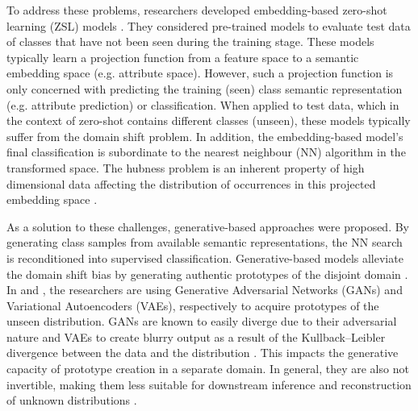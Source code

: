 \documentclass{article}
\begin{document}
To address these problems, researchers developed embedding-based zero-shot learning (ZSL) models \cite{b1, b2, b3, b4}. They considered pre-trained models to evaluate test data of classes that have not been seen during the training stage. These models typically learn a projection function from a feature space to a semantic embedding space (e.g. attribute space). However, such a projection function is only concerned with predicting the training (seen) class semantic representation (e.g. attribute prediction) or classification. When applied to test data, which in the context of zero-shot contains different classes (unseen), these models typically suffer from the domain shift problem. In addition, the embedding-based model's final classification is subordinate to the nearest neighbour (NN) algorithm in the transformed space. The hubness problem is an inherent property of high dimensional data affecting the distribution of occurrences in this projected embedding space \cite{b49}. 

As a solution to these challenges, generative-based approaches \cite{b44, b8, b61, b62} were proposed. By generating class samples from available semantic representations, the NN search is reconditioned into supervised classification. Generative-based models alleviate the domain shift bias by generating authentic prototypes of the disjoint domain \cite{b63}. In \cite{b5}\cite{b7} and \cite{b8, b9}, the researchers are using Generative Adversarial Networks (GANs) and Variational Autoencoders (VAEs), respectively to acquire prototypes of the unseen distribution. GANs are known to easily diverge due to their adversarial nature \cite{b12} and VAEs to create blurry output as a result of the Kullback–Leibler divergence between the data and the distribution \cite{b13}. This impacts the generative capacity of prototype creation in a separate domain. In general, they are also not invertible, making them less suitable for downstream inference and reconstruction of unknown distributions \cite{b75}.
\end{document}
